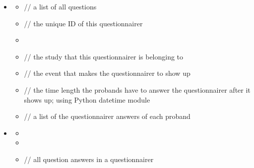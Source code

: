 \documentclass[a4paper]{scrreprt}
\begin{document}
\begin{itemize}
                    \item {}
                        \begin{itemize}
                            \item {}
                                \par // a list of all questions
                            \item {}
                                \par // the unique ID of this questionnairer
                            \item {}
                            \item {}
                                \par // the study that this questionnairer is belonging to
                            \item {}
                                \par // the event that makes the questionnairer to show up
                            \item {}
                                \par // the time length the probands have to answer the questionnairer after it shows up; using Python datetime module
                            \item {}
                                \par // a list of the questionnairer answers of each proband
                        \end{itemize}

                    \item {}
                        \begin{itemize}
                            \item {}
                            \item {}
                            \item {}
                                \par // all question answers in a questionnairer
                        \end{itemize}


\end{itemize}
\end{document}
